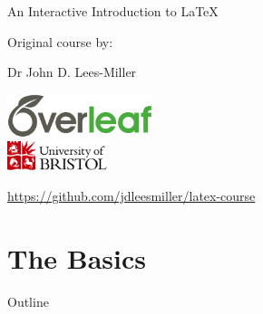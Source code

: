 \documentclass{beamer}
\begin{document}
 

\begin{frame}
\titlepage

  
\end{frame}


\begin{frame}{An Interactive Introduction to \LaTeX}
  \begin{center}
    Original course by:

    Dr John D. Lees-Miller
  
    \bigskip

    \includegraphics[height=36pt]{overleaf}\\[1em]
    \includegraphics[height=24pt]{UoB-logo}

    \bigskip

    \url{https://github.com/jdleesmiller/latex-course}
  \end{center}
\end{frame}


\section{The Basics}

\begin{frame}{Outline}
    \begin{multicols}{2}
    \tableofcontents[currentsection]
    \end{multicols}
\end{frame}
\end{document}
